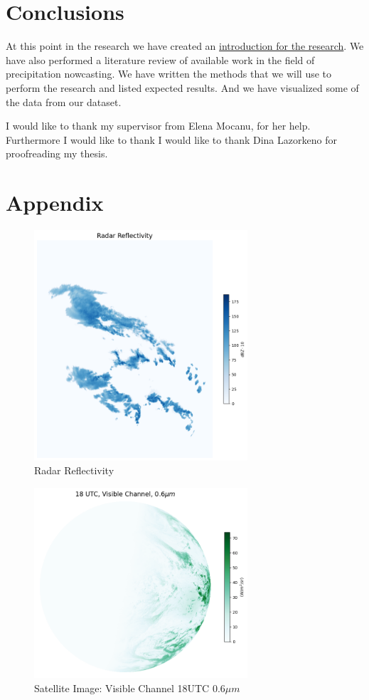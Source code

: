 \documentclass[acmtog, authorversion]{acmart}
\begin{document}
\section{Conclusions}
At this point in the research we have created an \hyperref[introduction]{introduction for the research}. We have also performed a literature review of available work in the field of precipitation nowcasting. We have written the methods that we will use to perform the research and listed expected results. And we have visualized some of the data from our dataset.

\begin{acks}
I would like to thank my supervisor from Elena Mocanu, for her help. Furthermore I would like to thank I would like to thank Dina Lazorkeno for proofreading my thesis.
\end{acks}




\newpage
\appendix
\section{Appendix}

\begin{figure}
    \centering
    \includegraphics[width=225pt]{./images/radar_reflectivity.png}
    \caption{Radar Reflectivity}
    \Description{}
    \label{fig:reflect}
\end{figure}

\begin{figure}
    \centering
    \includegraphics[width=225pt]{./images/vis_006.png}
    \caption{Satellite Image: Visible Channel 18UTC $0.6\mu m$}
    \Description{}
    \label{fig:vis}
\end{figure}
\end{document}
